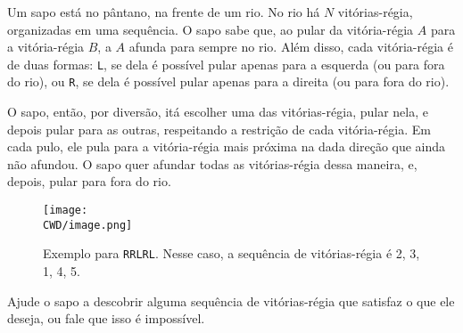 %

Um sapo está no pântano, na frente de um rio. No rio há $N$ vitórias-régia, organizadas em uma sequência. O sapo sabe que, ao pular da vitória-régia $A$ para a vitória-régia $B$, a $A$ afunda para sempre no rio. Além disso, cada vitória-régia é de duas formas: {\tt L}, se dela é possível pular apenas para a esquerda (ou para fora do rio), ou {\tt R}, se dela é possível pular apenas para a direita (ou para fora do rio).

O sapo, então, por diversão, itá escolher uma das vitórias-régia, pular nela, e depois pular para as outras, respeitando a restrição de cada vitória-régia. Em cada pulo, ele pula para a vitória-régia mais próxima na dada direção que ainda não afundou. O sapo quer afundar todas as vitórias-régia dessa maneira, e, depois, pular para fora do rio.

\begin{figure}[H]
  \centering
  \texttt{[image: \\CWD/image.png]}
  \caption{Exemplo para {\tt RRLRL}. Nesse caso, a sequência de vitórias-régia é 2, 3, 1, 4, 5.}
\end{figure}

Ajude o sapo a descobrir alguma sequência de vitórias-régia que satisfaz o que ele deseja, ou fale que isso é impossível.

%
%

%
%



\sampleio
